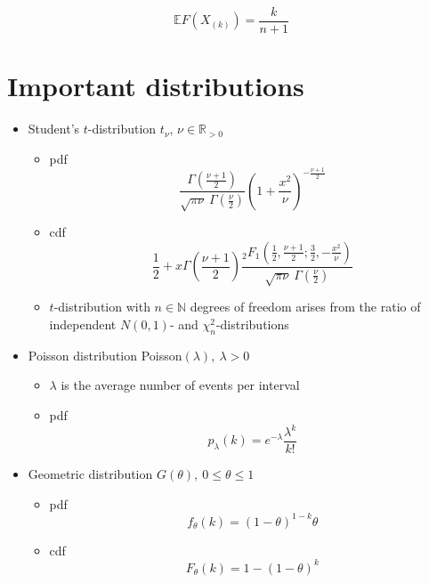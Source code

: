 \documentclass[12pt]{article}
\theoremstyle{definition}
\theoremstyle{remark}
\numberwithin{equation}{section}
\newcommand{\RR}{\mathbb{R}}
\newcommand{\NN}{\mathbb{N}}
\begin{document}
\begin{equation}\label{kth_order_expectation}
	\mathbb{E}F(X_{(k)}) = \frac k{n+1}
\end{equation}




\section{Important distributions}
\begin{itemize}
	\item Student's $t$-distribution $t_\nu$, $\nu\in\RR_{>0}$
	\begin{itemize}
		\item pdf
		\begin{equation}\label{t_pdf}
			\frac{\Gamma(\frac{\nu+1}2)}{\sqrt{\pi\nu}\ \Gamma(\frac\nu2)}\left(1+\frac {x^2}\nu\right)^{-\frac{\nu+1}2}
		\end{equation}
		\item cdf
		\begin{equation}\label{t_cdf}
			\frac 12 +x\Gamma\left(\frac{\nu+1}2\right)\frac{_2F_1\left(\frac 12, \frac {\nu+1}2; \frac 32, -\frac {x^2}\nu\right)}{\sqrt{\pi\nu}\ \Gamma(\frac\nu2)}
		\end{equation}
		\item $t$-distribution with $n\in\NN$ degrees of freedom arises from the ratio of independent $N(0,1)$- and $\chi^2_n$-distributions
	\end{itemize}
	\item Poisson distribution Poisson$(\lambda),\ \lambda > 0$
	\begin{itemize}
		\item $\lambda$ is the average number of events per interval
		\item pdf
		\begin{equation}\label{poisson_pdf}
			p_\lambda(k) = e^{-\lambda}\frac {\lambda^k}{k!}
		\end{equation}
	\end{itemize}


	\item Geometric distribution $G(\theta),\ 0\leq\theta\leq 1$
	\begin{itemize}
		\item pdf
		\begin{equation}\label{geometric_pdf}
			f_\theta(k) = (1-\theta)^{1-k}\theta
		\end{equation}
		\item cdf
		\begin{equation}\label{geometric_cdf}
			F_\theta(k) = 1-(1-\theta)^k
		\end{equation}
	\end{itemize}


\end{itemize}
\end{document}
